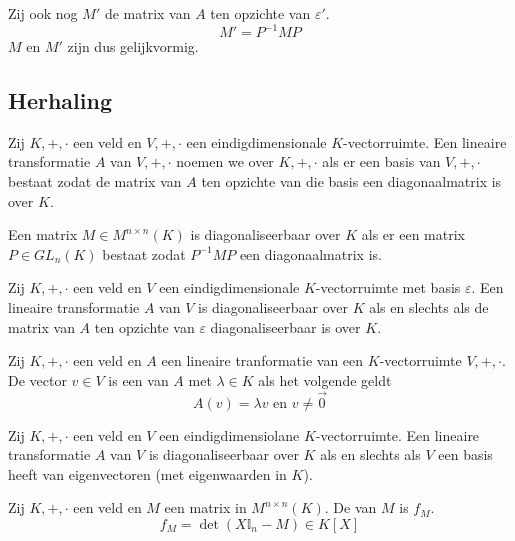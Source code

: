 \documentclass[main.tex]{subfiles}
\begin{document}
\begin{st}
  Zij ook nog $M'$ de matrix van $A$ ten opzichte van $\varepsilon'$.
  \[ M' = P^{-1}MP \]
  $M$ en $M'$ zijn dus gelijkvormig.
\end{st}

\subsection{Herhaling}
\label{sec:herhaling-1}

\begin{de}
  Zij $K,+,\cdot$ een veld en $V,+,\cdot$ een eindigdimensionale $K$-vectorruimte.
  Een lineaire transformatie $A$ van $V,+,\cdot$ noemen we  over $K,+,\cdot$ als er een basis van $V,+,\cdot$ bestaat zodat de matrix van $A$ ten opzichte van die basis een diagonaalmatrix is over $K$.
\end{de}

\begin{de}
  Een matrix $M\in M^{n\times n}(K)$ is diagonaliseerbaar over $K$ als er een matrix $P\in GL_{n}(K)$ bestaat zodat $P^{-1}MP$ een diagonaalmatrix is.
\end{de}

\begin{ei}
  Zij $K,+,\cdot$ een veld en $V$ een eindigdimensionale $K$-vectorruimte met basis $\varepsilon$.
  Een lineaire transformatie $A$ van $V$ is diagonaliseerbaar over $K$ als en slechts als de matrix van $A$ ten opzichte van $\varepsilon$ diagonaliseerbaar is over $K$.
\end{ei}

\begin{de}
  Zij $K,+,\cdot$ een veld en $A$ een lineaire tranformatie van een $K$-vectorruimte $V,+,\cdot$.
  De vector $v\in V$ is een  van $A$ met  $\lambda\in K$ als het volgende geldt
  \[ A(v) = \lambda v \text{ en } v\neq \vec{0} \]
\end{de}

\begin{ei}
  Zij $K,+,\cdot$ een veld en $V$ een eindigdimensiolane $K$-vectorruimte.
  Een lineaire transformatie $A$ van $V$ is diagonaliseerbaar over $K$ als en slechts als $V$ een basis heeft van eigenvectoren (met eigenwaarden in $K$).
\end{ei}

\begin{de}
  Zij $K,+,\cdot$ een veld en $M$ een matrix in $M^{n\times n}(K)$.
  De  van $M$ is $f_{M}$.
  \[ f_{M} = \det(X\mathbb{I}_{n} - M) \in K[X] \]
\end{de}
\end{document}
